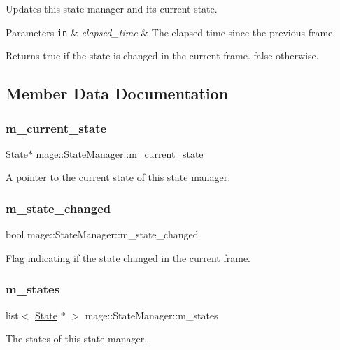 Updates this state manager and its current state.


\begin{DoxyParams}[1]{Parameters}
\mbox{\tt in}  & {\em elapsed\+\_\+time} & The elapsed time since the previous frame. \\
\hline
\end{DoxyParams}
\begin{DoxyReturn}{Returns}
{\ttfamily true} if the state is changed in the current frame. {\ttfamily false} otherwise. 
\end{DoxyReturn}


\subsection{Member Data Documentation}
\hypertarget{classmage_1_1_state_manager_a737122d580b709e0d122db4a6e1d9006}{}\label{classmage_1_1_state_manager_a737122d580b709e0d122db4a6e1d9006} 
\subsubsection{\texorpdfstring{m\+\_\+current\+\_\+state}{m\_current\_state}}
{\footnotesize\ttfamily \hyperlink{classmage_1_1_state}{State}$\ast$ mage\+::\+State\+Manager\+::m\+\_\+current\+\_\+state\hspace{0.3cm}{\ttfamily [private]}}

A pointer to the current state of this state manager. \hypertarget{classmage_1_1_state_manager_a8e905ec2358a18a5b56d44cf79799afa}{}\label{classmage_1_1_state_manager_a8e905ec2358a18a5b56d44cf79799afa} 
\subsubsection{\texorpdfstring{m\+\_\+state\+\_\+changed}{m\_state\_changed}}
{\footnotesize\ttfamily bool mage\+::\+State\+Manager\+::m\+\_\+state\+\_\+changed\hspace{0.3cm}{\ttfamily [private]}}

Flag indicating if the state changed in the current frame. \hypertarget{classmage_1_1_state_manager_a2181432805f365bfb8ccff0f959d2121}{}\label{classmage_1_1_state_manager_a2181432805f365bfb8ccff0f959d2121} 
\subsubsection{\texorpdfstring{m\+\_\+states}{m\_states}}
{\footnotesize\ttfamily list$<$ \hyperlink{classmage_1_1_state}{State} $\ast$ $>$ mage\+::\+State\+Manager\+::m\+\_\+states\hspace{0.3cm}{\ttfamily [private]}}

The states of this state manager. 